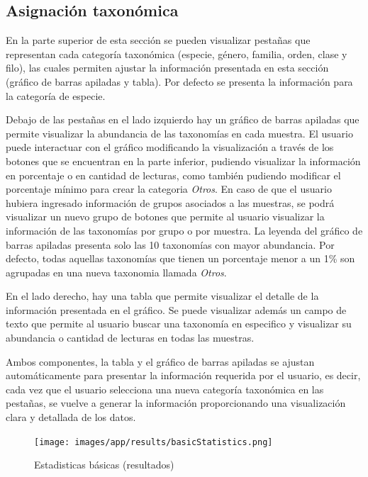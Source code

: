 \subsection{Asignación taxonómica}
En la parte superior de esta sección se pueden visualizar pestañas que representan cada categoría taxonómica (especie, género, familia, orden, clase y filo), las cuales permiten ajustar la información presentada en esta  sección (gráfico de barras apiladas y tabla). Por defecto se presenta la información para la categoría de especie.

Debajo de las pestañas en el lado izquierdo hay un gráfico de barras apiladas que permite visualizar la abundancia de las taxonomías en cada muestra.
El usuario puede interactuar con el gráfico modificando la visualización a través de los botones que se encuentran en la parte inferior, pudiendo visualizar la información en porcentaje o en cantidad de lecturas, como también pudiendo modificar el porcentaje mínimo para crear la categoria \textit{Otros}.
En caso de que el usuario hubiera ingresado información de grupos asociados a las muestras, se podrá visualizar un nuevo grupo de botones que permite al usuario visualizar la información de las taxonomías por grupo o por muestra.
La leyenda del gráfico de barras apiladas presenta solo las 10 taxonomías con mayor abundancia. 
Por defecto, todas aquellas taxonomías que tienen un porcentaje menor a un 1\%  son agrupadas en una nueva taxonomia llamada \textit{Otros}.



En el lado derecho, hay una tabla que permite visualizar el detalle de la información presentada en el gráfico. Se puede visualizar además un campo de texto que permite al usuario buscar una taxonomía en especifico y visualizar su abundancia o cantidad de lecturas en todas las muestras.


Ambos componentes, la tabla y el gráfico de barras apiladas se ajustan automáticamente para presentar la información requerida por el usuario, es decir, cada vez que el usuario selecciona una nueva categoría taxonómica en las pestañas, se vuelve a generar la información proporcionando una visualización clara y detallada de los datos.


\begin{figure}[H]
    \texttt{[image: images/app/results/basicStatistics.png]}

    \caption{Estadisticas básicas (resultados)}
    \label{fig:app-results-taxonomicAssig-sample-nreads}
\end{figure}

